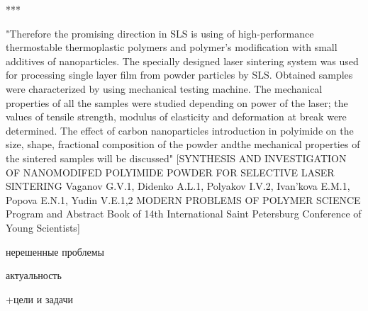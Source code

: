 	
	***
	
	"Therefore the promising direction in SLS is using of high-performance thermostable
thermoplastic polymers and polymer’s modification with small additives of nanoparticles.
The specially designed laser sintering system was used for processing single layer film from powder particles by SLS. Obtained
samples were characterized by using mechanical testing machine.
The mechanical properties of all the samples were studied depending on power of the laser; the values of tensile strength, modulus of
elasticity and deformation at break were determined. The effect of carbon nanoparticles introduction in polyimide on the size, shape,
fractional composition of the powder andthe mechanical properties of the sintered samples will be discussed"
[SYNTHESIS AND INVESTIGATION OF NANOMODIFED POLYIMIDE POWDER FOR
SELECTIVE LASER SINTERING
Vaganov G.V.1, Didenko A.L.1, Polyakov I.V.2, Ivan’kova E.M.1, Popova E.N.1, Yudin V.E.1,2 MODERN PROBLEMS
OF POLYMER SCIENCE
Program and Abstract Book
of 14th International Saint Petersburg Conference
of Young Scientists]	

нерешенные проблемы

актуальность

+цели и задачи
